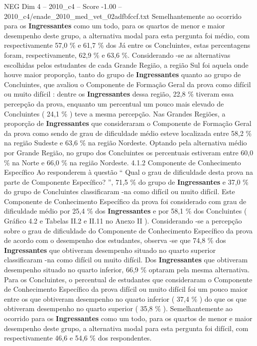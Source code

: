 \begin{textsample}{NEG Dim 4 – 2010\_c4 – Score -1.00 – 2010\_c4/enade\_2010\_med\_vet\_02adfbfccf.txt}
Semelhantemente ao ocorrido para os \textbf{Ingressantes} como um todo, para os quartos de menor e maior desempenho deste grupo, a alternativa modal para esta pergunta foi médio, com respectivamente 57,0 \% e 61,7 \% dos Já entre os Concluintes, estas percentagens foram, respectivamente, 62,9 \% e 63,6 \%.
Considerando -se as alternativas escolhidas pelos estudantes de cada Grande Região, a região Sul foi aquela onde houve maior proporção, tanto do grupo de \textbf{Ingressantes} quanto ao grupo de Concluintes, que avaliou o Componente de Formação Geral da prova como difícil ou muito difícil : dentre os \textbf{Ingressantes} dessa região, 22,8 \% tiveram essa percepção da prova, enquanto um percentual um pouco mais elevado de Concluintes ( 24,1 \% ) teve a mesma percepção.
Nas Grandes Regiões, a proporção de \textbf{Ingressantes} que consideraram o Componente de Formação Geral da prova como sendo de grau de dificuldade médio esteve localizada entre 58,2 \% na região Sudeste e 63,6 \% na região Nordeste.
Optando pela alternativa médio por Grande Região, no grupo dos Concluintes os percentuais estiveram entre 60,0 \% na Norte e 66,0 \% na região Nordeste. 4.1.2 Componente de Conhecimento Específico Ao responderem à questão “ Qual o grau de dificuldade desta prova na parte de Componente Específico? ”, 71,5 \% do grupo de \textbf{Ingressantes} e 37,0 \% do grupo de Concluintes classificaram -na como difícil ou muito difícil.
Este Componente de Conhecimento Específico da prova foi considerado com grau de dificuldade médio por 25,4 \% dos \textbf{Ingressantes} e por 58,1 \% dos Concluintes ( Gráfico 4.2 e Tabelas II.2 e II.11 no Anexo II ).
Considerando -se a percepção sobre o grau de dificuldade do Componente de Conhecimento Específico da prova de acordo com o desempenho dos estudantes, observa -se que 74,8 \% dos \textbf{Ingressantes} que obtiveram desempenho situado no quarto superior classificaram -na como difícil ou muito difícil.
Dos \textbf{Ingressantes} que obtiveram desempenho situado no quarto inferior, 66,9 \% optaram pela mesma alternativa.
Para os Concluintes, o percentual de estudantes que consideraram o Componente de Conhecimento Específico da prova difícil ou muito difícil foi um pouco maior entre os que obtiveram desempenho no quarto inferior ( 37,4 \% ) do que os que obtiveram desempenho no quarto superior ( 35,8 \% ).
Semelhantemente ao ocorrido para os \textbf{Ingressantes} como um todo, para os quartos de menor e maior desempenho deste grupo, a alternativa modal para esta pergunta foi difícil, com respectivamente 46,6 e 54,6 \% dos respondentes.

\end{textsample}
